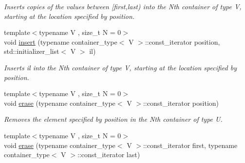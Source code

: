 \begin{DoxyCompactItemize}
\begin{DoxyCompactList}\small\item\em Inserts copies of the values between \mbox{[}first,last) into the Nth container of type V, starting at the location specified by position. \end{DoxyCompactList}\item 
\hypertarget{classheterogeneous_1_1heterovector_3_01_t_00_01_u_00_01_types_8_8_8_4_aebec39e9ed3bfb63010d656b297d78df}{}{\footnotesize template$<$typename V , size\+\_\+t N = 0$>$ }\\void \hyperlink{classheterogeneous_1_1heterovector_3_01_t_00_01_u_00_01_types_8_8_8_4_aebec39e9ed3bfb63010d656b297d78df}{insert} (typename container\+\_\+type$<$ V $>$\+::const\+\_\+iterator position, std\+::initializer\+\_\+list$<$ V $>$ il)\label{classheterogeneous_1_1heterovector_3_01_t_00_01_u_00_01_types_8_8_8_4_aebec39e9ed3bfb63010d656b297d78df}

\begin{DoxyCompactList}\small\item\em Inserts il into the Nth container of type V, starting at the location specified by position. \end{DoxyCompactList}\item 
\hypertarget{classheterogeneous_1_1heterovector_3_01_t_00_01_u_00_01_types_8_8_8_4_ad35e30d0253f3378c76ecf62805f469a}{}{\footnotesize template$<$typename V , size\+\_\+t N = 0$>$ }\\void \hyperlink{classheterogeneous_1_1heterovector_3_01_t_00_01_u_00_01_types_8_8_8_4_ad35e30d0253f3378c76ecf62805f469a}{erase} (typename container\+\_\+type$<$ V $>$\+::const\+\_\+iterator position)\label{classheterogeneous_1_1heterovector_3_01_t_00_01_u_00_01_types_8_8_8_4_ad35e30d0253f3378c76ecf62805f469a}

\begin{DoxyCompactList}\small\item\em Removes the element specified by position in the Nth container of type U. \end{DoxyCompactList}\item 
\hypertarget{classheterogeneous_1_1heterovector_3_01_t_00_01_u_00_01_types_8_8_8_4_a675b74a6bc7738a25943430de6f02a86}{}{\footnotesize template$<$typename V , size\+\_\+t N = 0$>$ }\\void \hyperlink{classheterogeneous_1_1heterovector_3_01_t_00_01_u_00_01_types_8_8_8_4_a675b74a6bc7738a25943430de6f02a86}{erase} (typename container\+\_\+type$<$ V $>$\+::const\+\_\+iterator first, typename container\+\_\+type$<$ V $>$\+::const\+\_\+iterator last)\label{classheterogeneous_1_1heterovector_3_01_t_00_01_u_00_01_types_8_8_8_4_a675b74a6bc7738a25943430de6f02a86}


\end{DoxyCompactItemize}
